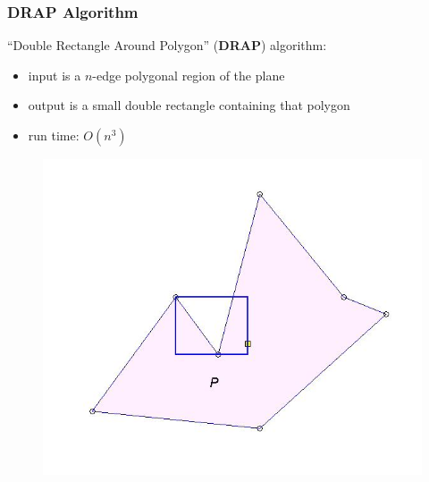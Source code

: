 \documentclass[compress]{beamer}
\begin{document}
\begin{frame} \frametitle{DRAP Algorithm}
``Double Rectangle Around Polygon'' (\textbf{DRAP}) algorithm:\\
\begin{itemize}
     \item input is a $n$-edge polygonal region of the plane
    \item output is a small double rectangle containing that polygon
    \item run time: $O(n^3)$
\end{itemize}

    \begin{figure}
    \includegraphics[scale=0.3]{drap1.jpg}
    \end{figure}

\transboxout
\end{frame}
\end{document}
